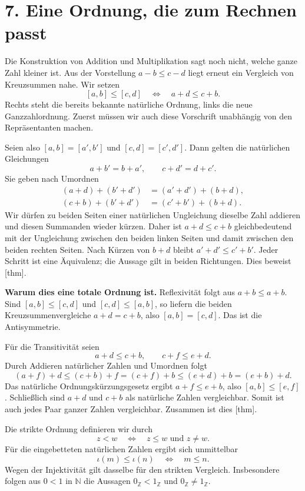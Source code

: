 \par{}
\hypertarget{integers.reading.order}{}
\section*{7. Eine Ordnung, die zum Rechnen passt}

Die Konstruktion von Addition und Multiplikation sagt noch nicht,
welche ganze Zahl kleiner ist. Aus der Vorstellung \(a-b\leq c-d\)
liegt erneut ein Vergleich von Kreuzsummen nahe. Wir setzen
\[
  [a,b]\leq[c,d]
  \quad\Longleftrightarrow\quad
  a+d\leq c+b.
\]
Rechts steht die bereits bekannte natürliche Ordnung, links die
neue Ganzzahlordnung. Zuerst müssen wir auch diese Vorschrift
unabhängig von den Repräsentanten machen.

Seien also \([a,b]=[a',b']\) und \([c,d]=[c',d']\).
Dann gelten die natürlichen Gleichungen
\[
  a+b'=b+a',
  \qquad c+d'=d+c'.
\]
Sie geben nach Umordnen
\[
  \begin{aligned}
    (a+d)+(b'+d')&=(a'+d')+(b+d),\\
    (c+b)+(b'+d')&=(c'+b')+(b+d).
  \end{aligned}
\]
Wir dürfen zu beiden Seiten einer natürlichen Ungleichung dieselbe
Zahl addieren und diesen Summanden wieder kürzen. Daher ist
\(a+d\leq c+b\) gleichbedeutend mit der Ungleichung zwischen
den beiden linken Seiten und damit zwischen den beiden rechten
Seiten. Nach Kürzen von \(b+d\) bleibt
\(a'+d'\leq c'+b'\). Jeder Schritt ist eine Äquivalenz;
die Aussage gilt in beiden Richtungen. Dies beweist
[thm].

\medskip\noindent\textbf{Warum dies eine totale Ordnung ist.}
Reflexivität folgt aus \(a+b\leq a+b\). Sind
\([a,b]\leq[c,d]\) und \([c,d]\leq[a,b]\), so liefern die
beiden Kreuzsummenvergleiche \(a+d=c+b\), also
\([a,b]=[c,d]\). Das ist die Antisymmetrie.

Für die Transitivität seien
\[
  a+d\leq c+b,
  \qquad c+f\leq e+d.
\]
Durch Addieren natürlicher Zahlen und Umordnen folgt
\[
  (a+f)+d
    \leq(c+b)+f
    =(c+f)+b
    \leq(e+d)+b
    =(e+b)+d.
\]
Das natürliche Ordnungskürzungsgesetz ergibt
\(a+f\leq e+b\), also \([a,b]\leq[e,f]\).
Schließlich sind \(a+d\) und \(c+b\) als natürliche Zahlen
vergleichbar. Somit ist auch jedes Paar ganzer Zahlen vergleichbar.
Zusammen ist dies [thm].

Die strikte Ordnung definieren wir durch
\[
  z<w\quad\Longleftrightarrow\quad z\leq w\text{ und }z\ne w.
\]
Für die eingebetteten natürlichen Zahlen ergibt sich unmittelbar
\[
  \iota(m)\leq\iota(n)
  \quad\Longleftrightarrow\quad m\leq n.
\]
Wegen der Injektivität gilt dasselbe für den strikten Vergleich.
Insbesondere folgen aus \(0<1\) in \(\mathbb N\) die Aussagen
\(0_{\mathbb Z}<1_{\mathbb Z}\) und
\(0_{\mathbb Z}\ne1_{\mathbb Z}\).

